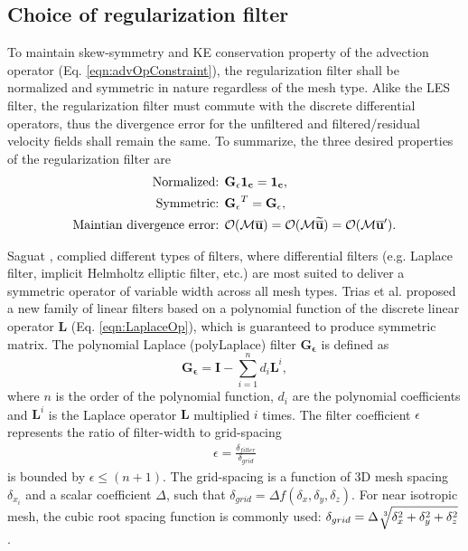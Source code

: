 \subsection{Choice of regularization filter}
\label{sec:diffFilter}
To maintain skew-symmetry and KE conservation property of the advection operator (Eq. \eqref{eqn:advOpConstraint}), the regularization filter shall be normalized and symmetric in nature regardless of the mesh type. Alike the LES filter, the regularization filter must commute with the discrete differential operators, thus the divergence error for the unfiltered and filtered/residual velocity fields shall remain the same. To summarize, the three desired properties of the regularization filter are 
\begin{align}
\begin{split}
\text{Normalized: } & \mathbf{G_{\epsilon} 1_c} = \mathbf{1_c},
\\
\text{Symmetric: } & \mathbf{G_{\epsilon}}^T = \mathbf{G_{\epsilon}},
\\
\text{Maintian divergence error: } & \mathcal{O}( \mathcal{M}\overline{\mathbf{u}}) = \mathcal{O}(\mathcal{M}\widetilde{\overline{\mathbf{u}}}) = \mathcal{O}(\mathcal{M}{\overline{\mathbf{u}}}^{\prime}).
\end{split}
\label{eqn:filterProperties}
\end{align}

Saguat \cite[chapter 2]{sagaut2006les}, \cite{sagaut1999} complied different types of filters, where differential filters (e.g. Laplace filter, implicit Helmholtz elliptic filter, etc.) are most suited to deliver a symmetric operator of variable width across all mesh types. Trias et al. \cite{trias2011discretefilter} proposed a new family of linear filters based on a polynomial function of the discrete linear operator $\mathbf{L}$ (Eq. \eqref{eqn:LaplaceOp}), which is guaranteed to produce symmetric matrix. The polynomial Laplace (polyLaplace) filter $\mathbf{G_{\epsilon}}$ is defined as 
\begin{equation}
\mathbf{G_{\epsilon}} = \mathbf{I} - \sum_{i=1}^{n} d_i \mathbf{L}^i,
\label{eqn:polyLaplace}
\end{equation}
where $n$ is the order of the polynomial function, $d_i$ are the polynomial coefficients and $\mathbf{L}^i$ is the Laplace operator $\mathbf{L}$ multiplied $i$ times. The filter coefficient $\epsilon$ represents the ratio of filter-width to grid-spacing
\begin{align}
\epsilon = \frac{\delta_{filter}}{\delta_{grid}}
\end{align} 
is bounded by $\epsilon \leqslant (n+1)$. The grid-spacing is a function of 3D mesh spacing $\delta_{x_i} $ and a scalar coefficient $\Delta$, such that $\delta_{grid} = \Delta f(\delta_x, \delta_y, \delta_z)$. For near isotropic mesh, the cubic root spacing function is commonly used: $\delta_{grid} = \Delta \cubicRoot{\delta_x^2 + \delta_y^2 + \delta_z^2}$. 

